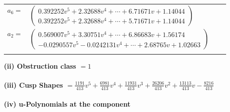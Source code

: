 \documentclass[1p]{elsarticle_modified}
\theoremstyle{definition}
\begin{document}
\begin{tabular}{m{7pt} m{180pt} m{7pt} m{180pt} }
\flushright $a_{6}=$&$\begin{pmatrix}0.392252 v^{5}+2.32688 v^{4}+\cdots+6.71671 v+1.14044\\0.392252 v^{5}+2.32688 v^{4}+\cdots+5.71671 v+1.14044\end{pmatrix}$ \\
\flushright $a_{2}=$&$\begin{pmatrix}0.569007 v^{5}+3.30751 v^{4}+\cdots+6.86683 v+1.56174\\-0.0290557 v^{5}-0.0242131 v^{4}+\cdots+2.68765 v+1.02663\end{pmatrix}$\\&\end{tabular}
\flushleft \textbf{(ii) Obstruction class $= 1$}\\~\\
\flushleft \textbf{(iii) Cusp Shapes $= \frac{1191}{413} v^5+\frac{6981}{413} v^4+\frac{11931}{413} v^3+\frac{26206}{413} v^2+\frac{13113}{413} v-\frac{8216}{413}$}\\~\\
\newpage\renewcommand{\arraystretch}{1}
\flushleft \textbf{(iv) u-Polynomials at the component}\newline \\
\end{document}
